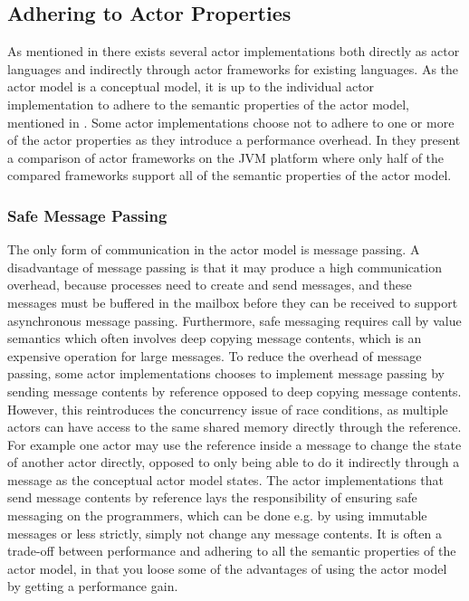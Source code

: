 \subsection{Adhering to Actor Properties}\label{ssec:adhere_actor_prop}
As mentioned in  there exists several actor implementations both directly as actor languages and indirectly through actor frameworks for existing languages. As the actor model is a conceptual model, it is up to the individual actor implementation to adhere to the semantic properties of the actor model, mentioned in . Some actor implementations choose not to adhere to one or more of the actor properties as they introduce a performance overhead. In \cite{karmani2009actor} they present a comparison of actor frameworks on the JVM platform where only half of the compared frameworks support all of the semantic properties of the actor model. 

\subsubsection{Safe Message Passing}
The only form of communication in the actor model is message passing. A disadvantage of message passing is that it may produce a high communication overhead, because processes need to create and send messages, and these messages must be buffered in the mailbox before they can be received to support asynchronous message passing\cite[p. 17]{haller2012actors}. Furthermore, safe messaging requires call by value semantics which often involves deep copying message contents, which is an expensive operation for large messages. To reduce the overhead of message passing, some actor implementations chooses to implement message passing by sending message contents by reference opposed to deep copying message contents. However, this reintroduces the concurrency issue of race conditions, as multiple actors can have access to the same shared memory directly through the reference. For example one actor may use the reference inside a message to change the state of another actor directly, opposed to only being able to do it indirectly through a message as the conceptual actor model states. The actor implementations that send message contents by reference lays the responsibility of ensuring safe messaging on the programmers, which can be done e.g. by using immutable messages or less strictly, simply not change any message contents. It is often a trade-off between performance and adhering to all the semantic properties of the actor model, in that you loose some of the advantages of using the actor model by getting a performance gain.

